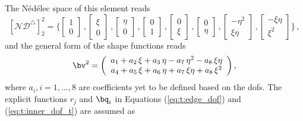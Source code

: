 The  N\'ed\'elec space of this element reads 
 \begin{equation}
  \left[ \mathcal{ND}^\triangle \right]^{2}_2 = \bigg\{ \left[ \begin{array}{c}
1 \\
0  
  \end{array} \right] \,, \left[ \begin{array}{c}
 \xi \\
0
  \end{array} \right]  \,,  \left[ \begin{array}{c}
 \eta \\
0  \end{array} \right] \,, \left[ \begin{array}{c}
0 \\
1  
  \end{array} \right] \,, \left[ \begin{array}{c}
0 \\
\xi
  \end{array} \right]  \,,  \left[ \begin{array}{c}
0 \\
\eta  \end{array} \right]   \,,   \left[ \begin{array}{c}
- \eta^2 \\
\xi \eta
  \end{array} \right]   \,,   \left[ \begin{array}{c}
- \xi \eta \\
\xi^2
  \end{array} \right] \bigg\}\,,
 \end{equation}
and the general form of the shape functions reads
\begin{equation}
\bv^2 =  \left( \begin{array}{c}
a_1 + a_2 \, \xi + a_3 \, \eta - a_7 \, \eta^2 - a_8 \, \xi\eta \\
a_4 + a_5 \, \xi + a_6 \, \eta + a_7 \, \xi\eta + a_8 \, \xi^2
\end{array} \right) ,
\end{equation}
where $a_i, i=1,...,8$ are coefficients yet to be defined based on the dofs. 
The explicit functions $r_j$ and $\bq_i$ in Equations (\ref{eq:t:edge_dof}) and (\ref{eq:t:inner_dof_t}) are assumed as  
